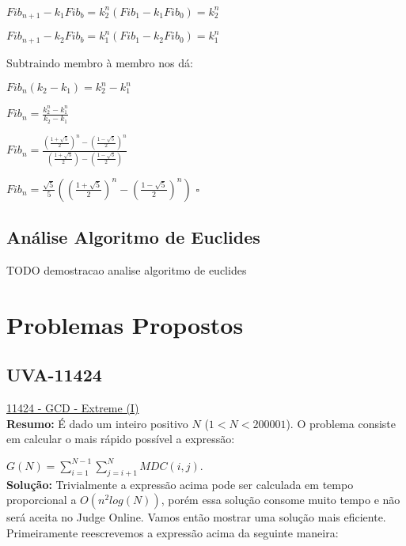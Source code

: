 $Fib_{n+1} - k_1Fib_b = k_2^n(Fib_1 - k_1Fib_0) = k_2^n$

$Fib_{n+1} - k_2Fib_b = k_1^n(Fib_1 - k_2Fib_0) = k_1^n$

Subtraindo membro à membro nos dá:

$Fib_n(k_2 - k_1) = k_2^n - k_1^n$

$Fib_n = \frac{k_2^n - k_1^n}{k_2 - k_1}$

$Fib_n = \frac{(\frac{1+\sqrt{5}}{2})^n - (\frac{1-\sqrt{5}}{2})^n}{(\frac{1+\sqrt{5}}{2}) - (\frac{1-\sqrt{5}}{2})}$

$Fib_n = \frac{\sqrt{5}}{5}((\frac{1+\sqrt{5}}{2})^n - (\frac{1-\sqrt{5}}{2})^n)$ $\square$


\subsection{Análise Algoritmo de Euclides}
TODO demostracao analise algoritmo de euclides


\section{Problemas Propostos}


\subsection{UVA-11424}
\href{https://uva.onlinejudge.org/index.php?option=onlinejudge&page=show_problem&problem=2419}{11424 - GCD - Extreme (I)} \\

\textbf{Resumo:}
É dado um inteiro positivo $N$ ($1 < N < 200001$). O problema consiste em calcular o mais rápido possível a expressão:

$G(N) = \sum_{i=1}^{N-1}\sum_{j=i+1}^{N}MDC(i,j)$.
\\

\textbf{Solução:}
Trivialmente a expressão acima pode ser calculada em tempo proporcional a $O(n^2log(N))$, porém essa solução consome muito tempo e não será aceita no Judge Online. Vamos então mostrar uma solução mais eficiente.
\\

Primeiramente reescrevemos a expressão acima da seguinte maneira:

